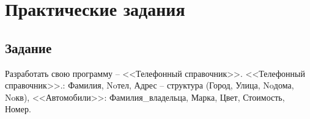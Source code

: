 \section{Практические задания}

\subsection{Задание }

Разработать свою программу -- <<Телефонный справочник>>.
<<Телефонный справочник>>.: Фамилия, Noтел, Адрес -- структура (Город, Улица, Noдома, Noкв),
<<Автомобили>>: Фамилия\_владельца, Марка, Цвет, Стоимость, Номер.

